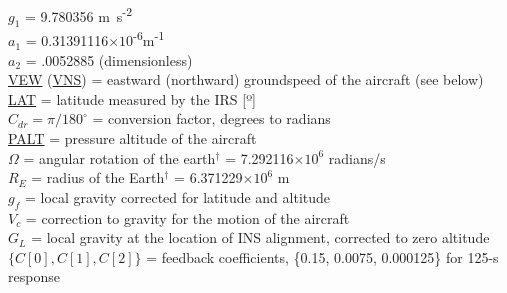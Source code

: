 \documentclass[
  english,
]{book}
\begin{document}
\(g_{1}\) = 9.780356 m~s\textsuperscript{-2}\\
\(a_{1}\) =
0.31391116\(\times 10\)\textsuperscript{-6}m\textsuperscript{-1}\\
\(a_{2}\) = .0052885 (dimensionless)\\
\protect\hyperlink{vew}{VEW} (\protect\hyperlink{vns}{VNS}) = eastward
(northward) groundspeed of the aircraft (see below)\\
\protect\hyperlink{latitude}{LAT} = latitude measured by the IRS
{[}º{]}\\
\(C_{dr}=\pi/180^{\circ}\) = conversion factor, degrees to radians\\
\protect\hyperlink{palt}{PALT} = pressure altitude of the aircraft\\
\(\Omega\) = angular rotation of the earth\(^{\dagger}\) =
7.292116\(\times10^{6}\) radians/s\\
\(R_{E}\) = radius of the Earth\(^{\dagger}\) = 6.371229\(\times10^{6}\)
m\\
\(g_{f}\) = local gravity corrected for latitude and altitude\\
\(V_{c}\) = correction to gravity for the motion of the aircraft\\
\(G_{L}\) = local gravity at the location of INS alignment, corrected to
zero altitude\\
\(\{C[0],C[1],C[2]\}\) = feedback coefficients, \{0.15, 0.0075,
0.000125\} for 125-s response
\end{document}
